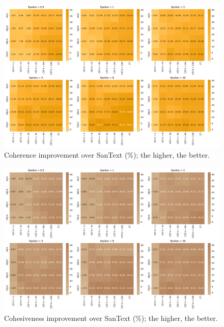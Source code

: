 \begin{figure}
    \centering
    \includegraphics[width=15cm]{latex/fig/heatmap_coherence.pdf}
    \caption{Coherence improvement over SanText (\%); the higher, the better.}
    \label{fig:coherence}
\end{figure}


\begin{figure}
    \centering
    \includegraphics[width=15cm]{latex/fig/heatmap_cohesiveness.pdf}
    \caption{Cohesiveness improvement over SanText (\%); the higher, the better.}
    \label{fig:cohesiveness}
\end{figure}
